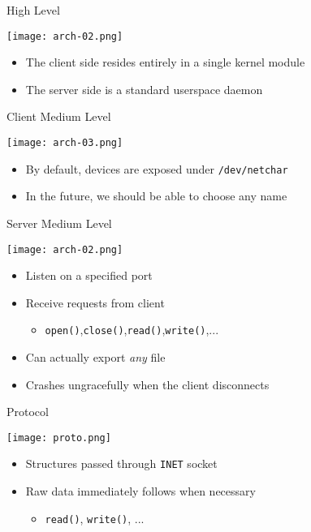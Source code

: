 \documentclass[handout]{beamer}
\begin{document}
\begin{frame}[c]{High Level}
  \begin{center}
    \texttt{[image: arch-02.png]}
  \end{center}

  \begin{itemize}
    \item<1-> The client side resides entirely in a single kernel module
    \item<2-> The server side is a standard userspace daemon
  \end{itemize}
\end{frame}

\begin{frame}[c]{Client Medium Level}
  \begin{center}
    \texttt{[image: arch-03.png]}
  \end{center}

  \begin{itemize}
    \item<1-> By default, devices are exposed under \texttt{/dev/netchar}
    \item<2-> In the future, we should be able to choose any name
  \end{itemize}
\end{frame}

\begin{frame}[c]{Server Medium Level}
  \begin{center}
    \texttt{[image: arch-02.png]}
  \end{center}
  \begin{itemize}
    \item<1-> Listen on a specified port
    \item<2-> Receive requests from client
    \begin{itemize}
      \item<2-> \texttt{open()},\texttt{close()},\texttt{read()},\texttt{write()},...
    \end{itemize}
    \item<3-> Can actually export \textit{any} file
    \item<4-> Crashes ungracefully when the client disconnects
  \end{itemize}
\end{frame}

\begin{frame}[c]{Protocol}
  \begin{center}
    \texttt{[image: proto.png]}
  \end{center}

  \begin{itemize}
    \item<1-> Structures passed through \texttt{INET} socket
    \item<2-> Raw data immediately follows when necessary
    \begin{itemize}
      \item<2-> \texttt{read()}, \texttt{write()}, ...
    \end{itemize}
  \end{itemize}
\end{frame}
\end{document}
